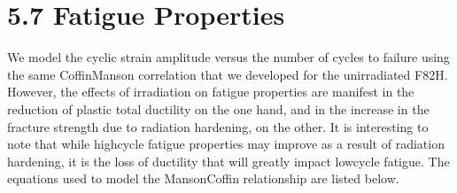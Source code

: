 \documentclass[letterpaper,10pt,english]{jupyterBook}
\begin{document}
	\section{5.7 Fatigue Properties}
	\label{\detokenize{5 Radiation Effects on Mechanical Properties:fatigue-properties}}
	\sphinxAtStartPar
	We model the cyclic strain amplitude versus the number of cycles to failure using the same Coffin\sphinxhyphen{}Manson correlation that we developed for the unirradiated F82H.  However, the effects of irradiation on fatigue properties are manifest in the reduction of plastic total ductility on the one hand, and in the increase in the fracture strength due to radiation hardening, on the other. It is interesting to note that while high\sphinxhyphen{}cycle fatigue properties may improve as a result of radiation hardening, it is the loss of ductility that will greatly impact low\sphinxhyphen{}cycle fatigue.  The equations used to model the Manson\sphinxhyphen{}Coffin relationship are listed below.
	
\end{document}
